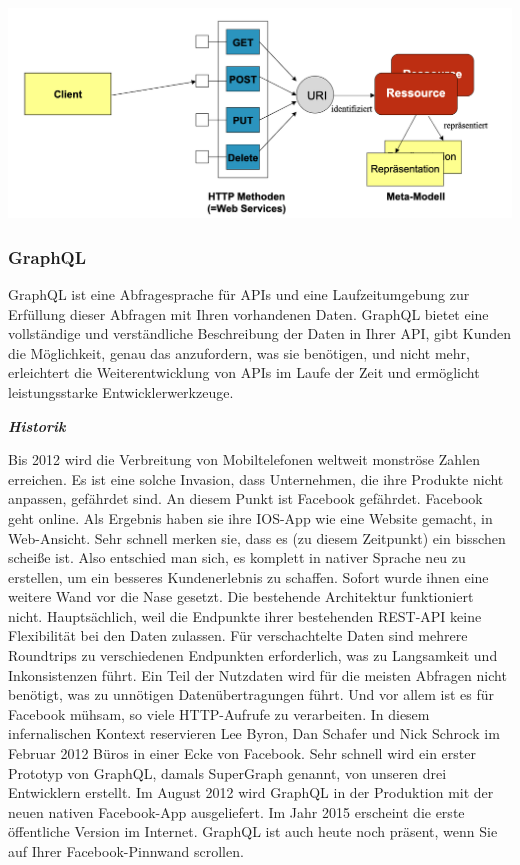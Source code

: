 \begin{center}
\includegraphics[scale=.3]{images/Aufbau_eine REST-basierten_Web_Services_Architektur}
\end{center}

\subsubsection{GraphQL}

GraphQL ist eine Abfragesprache für APIs und eine Laufzeitumgebung zur Erfüllung dieser Abfragen mit Ihren vorhandenen Daten. GraphQL bietet eine vollständige und verständliche Beschreibung der Daten in Ihrer API, gibt Kunden die Möglichkeit, genau das anzufordern, was sie benötigen, und nicht mehr, erleichtert die Weiterentwicklung von APIs im Laufe der Zeit und ermöglicht leistungsstarke Entwicklerwerkzeuge.\cite{graphQL}

\textit{\textbf{Historik}}

Bis 2012 wird die Verbreitung von Mobiltelefonen weltweit monströse Zahlen erreichen. Es ist eine solche Invasion, dass Unternehmen, die ihre Produkte nicht anpassen, gefährdet sind. An diesem Punkt ist Facebook gefährdet. Facebook geht online. Als Ergebnis haben sie ihre IOS-App wie eine Website gemacht, in Web-Ansicht. Sehr schnell merken sie, dass es (zu diesem Zeitpunkt) ein bisschen scheiße ist. Also entschied man sich, es komplett in nativer Sprache neu zu erstellen, um ein besseres Kundenerlebnis zu schaffen. Sofort wurde ihnen eine weitere Wand vor die Nase gesetzt. Die bestehende Architektur funktioniert nicht. Hauptsächlich, weil die Endpunkte ihrer bestehenden REST-API keine Flexibilität bei den Daten zulassen. Für verschachtelte Daten sind mehrere Roundtrips zu verschiedenen Endpunkten erforderlich, was zu Langsamkeit und Inkonsistenzen führt. Ein Teil der Nutzdaten wird für die meisten Abfragen nicht benötigt, was zu unnötigen Datenübertragungen führt. Und vor allem ist es für Facebook mühsam, so viele HTTP-Aufrufe zu verarbeiten.
In diesem infernalischen Kontext reservieren Lee Byron, Dan Schafer und Nick Schrock im Februar 2012 Büros in einer Ecke von Facebook. Sehr schnell wird ein erster Prototyp von GraphQL, damals SuperGraph genannt, von unseren drei Entwicklern erstellt. Im August 2012 wird GraphQL in der Produktion mit der neuen nativen Facebook-App ausgeliefert. Im Jahr 2015 erscheint die erste öffentliche Version im Internet. GraphQL ist auch heute noch präsent, wenn Sie auf Ihrer Facebook-Pinnwand scrollen.\cite{graphQL2}

